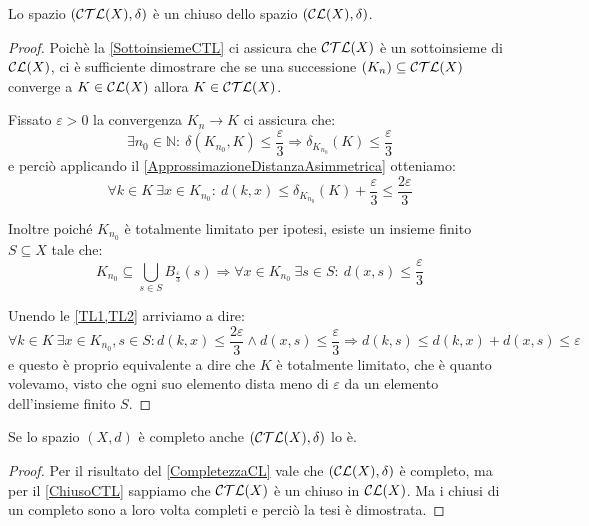 \begin{lemma}\label{ChiusoCTL}
	Lo spazio $(\mathcal{CTL}(X),\delta)$ è un chiuso dello spazio $(\mathcal{CL}(X),\delta)$.
\end{lemma}
\begin{proof}
	Poichè la \cref{SottoinsiemeCTL} ci assicura che $\mathcal{CTL}(X)$ è un sottoinsieme di $\mathcal{CL}(X)$, ci è sufficiente dimostrare che se una successione $(K_n) \subseteq \mathcal{CTL}(X)$ converge a $K\in\mathcal{CL}(X)$ allora $K\in\mathcal{CTL}(X)$.
	
	Fissato $\varepsilon>0$ la convergenza $K_n\to K$ ci assicura che:
	\begin{equation*}
		\exists n_0\in\mathbb{N}:\ \delta(K_{n_0},K)\le \frac{\varepsilon}3
		\Longrightarrow \delta_{K_{n_0}}(K)\le \frac{\varepsilon}3
	\end{equation*}
	e perciò applicando il \cref{ApprossimazioneDistanzaAsimmetrica} otteniamo:
	\begin{equation}\label{TL1}
		\forall k\in K\ \exists x\in K_{n_0}:
		\ d(k,x)\le \delta_{K_{n_0}}(K)+\frac{\varepsilon}3\le \frac{2\varepsilon}3
	\end{equation}
	
	Inoltre poiché $K_{n_0}$ è totalmente limitato per ipotesi, esiste un insieme finito $S \subseteq X$ tale che:
	\begin{equation}\label{TL2}
		K_{n_0}\subseteq \bigcup_{s\in S} B_{\frac{\varepsilon}3}(s)
		\Longrightarrow \forall x\in K_{n_0}\ \exists s\in S:\ d(x,s)\le \frac{\varepsilon}3
	\end{equation}
	
	Unendo le \cref{TL1,TL2} arriviamo a dire:
	\begin{equation}
		\forall k\in K\ \exists x\in K_{n_0},s\in S: d(k,x)\le \frac{2\varepsilon}3 \wedge d(x,s)\le \frac{\varepsilon}3
		\Longrightarrow d(k,s)\le d(k,x)+d(x,s) \le \varepsilon
	\end{equation}
	e questo è proprio equivalente a dire che $K$ è totalmente limitato, che è quanto volevamo, visto che ogni suo elemento dista meno di $\varepsilon$ da un elemento dell'insieme finito $S$.
\end{proof}

\begin{corollary}\label{CompletezzaCTL}
	Se lo spazio $(X,d)$ è completo anche $(\mathcal{CTL}(X),\delta)$ lo è.
\end{corollary}
\begin{proof}
	Per il risultato del \cref{CompletezzaCL} vale che $(\mathcal{CL}(X),\delta)$ è completo, ma per il \cref{ChiusoCTL} sappiamo che $\mathcal{CTL}(X)$ è un chiuso in $\mathcal{CL}(X)$. Ma i chiusi di un completo sono a loro volta completi e perciò la tesi è dimostrata.
\end{proof}

